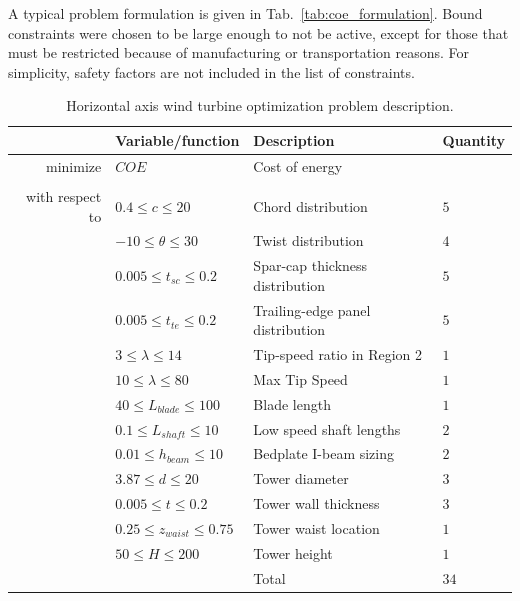 \documentclass[]{aiaa-tc} %
\begin{document}
    A typical problem formulation is given in Tab.~\ref{tab:coe_formulation}.  Bound constraints were chosen to be 
    large enough to not be active, except for those that must be restricted because of manufacturing or 
    transportation reasons.  For simplicity, safety factors are not included in the list of constraints. 


    \begin{table}
        \centering
        \caption{Horizontal axis wind turbine optimization problem description.}
        \begin{tabular}{r l l l}
            \hline
            & Variable/function & Description & Quantity \\
            \hline
            minimize            & $COE$ & Cost of energy \\
            \\
            with respect to & $0.4 \le c \le 20$ & Chord distribution & $5$ \\
                                    & $-10 \le \theta \le 30$ & Twist distribution & $4$ \\
                                    & $0.005 \le t_{sc} \le 0.2$ & Spar-cap thickness distribution & $5$ \\
                                    & $0.005 \le t_{te} \le 0.2$ & Trailing-edge panel distribution & $5$ \\
                                    & $3 \le \lambda \le 14$ & Tip-speed ratio in Region 2 & $1$ \\
                                    & $10 \le \lambda \le 80$ & Max Tip Speed & $1$ \\
                                    & $40 \le L_{blade} \le 100$ & Blade length & $1$ \\
                                    & $0.1 \le L_{shaft} \le 10$ & Low speed shaft lengths & $2$ \\
                                    & $0.01 \le h_{beam} \le 10$ & Bedplate I-beam sizing & $2$ \\
                                    & $3.87 \le d \le 20$ & Tower diameter & $3$ \\
                                    & $0.005 \le t \le 0.2$ & Tower wall thickness & $3$ \\
                                    & $0.25 \le z_{waist} \le 0.75$ & Tower waist location & $1$ \\
                                    & $50 \le H \le 200$ & Tower height & $1$ \\
                                    & & Total & $34$ \\


\end{tabular}
\end{table}
\end{document}
